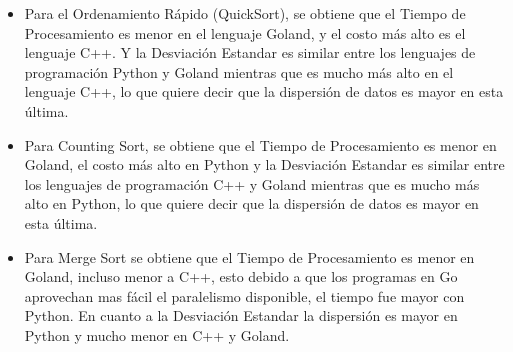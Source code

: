 \documentclass{article}
\begin{document}
\begin{itemize}
            \item Para el Ordenamiento Rápido (QuickSort), se obtiene que el Tiempo de Procesamiento es menor en el lenguaje Goland, y el costo más alto es el lenguaje C++. Y la Desviación Estandar es similar entre los lenguajes de programación Python y Goland mientras que es mucho más alto en el lenguaje C++, lo que quiere decir que la dispersión de datos es mayor en esta última.
\end{itemize}
\begin{itemize}
            \item Para Counting Sort, se obtiene que el Tiempo de Procesamiento es menor en Goland, el costo más alto en Python y la Desviación Estandar es similar entre los lenguajes de programación C++ y Goland mientras que es mucho más alto en Python, lo que quiere decir que la dispersión de datos es mayor en esta última.
\end{itemize}

\begin{itemize}
            \item Para Merge Sort se obtiene que el Tiempo de Procesamiento es menor en Goland, incluso menor a C++, esto debido a que los programas en Go aprovechan mas fácil el paralelismo disponible, el tiempo fue mayor con Python. En cuanto a la Desviación Estandar la dispersión es mayor en Python y mucho menor en C++ y Goland.
\end{itemize}    
	
		
	
\end{document}
